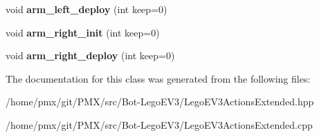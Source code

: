 \begin{DoxyCompactItemize}
void {\bfseries arm\+\_\+left\+\_\+deploy} (int keep=0)
\item 
\mbox{\label{classLegoEV3ActionsExtended_a9a5fe55314c969c892b90232cf8d70c9}} 
void {\bfseries arm\+\_\+right\+\_\+init} (int keep=0)
\item 
\mbox{\label{classLegoEV3ActionsExtended_a9a28606d70012c88a9b4382e8eb07371}} 
void {\bfseries arm\+\_\+right\+\_\+deploy} (int keep=0)
\end{DoxyCompactItemize}


The documentation for this class was generated from the following files\+:\begin{DoxyCompactItemize}
\item 
/home/pmx/git/\+P\+M\+X/src/\+Bot-\/\+Lego\+E\+V3/Lego\+E\+V3\+Actions\+Extended.\+hpp\item 
/home/pmx/git/\+P\+M\+X/src/\+Bot-\/\+Lego\+E\+V3/Lego\+E\+V3\+Actions\+Extended.\+cpp\end{DoxyCompactItemize}
